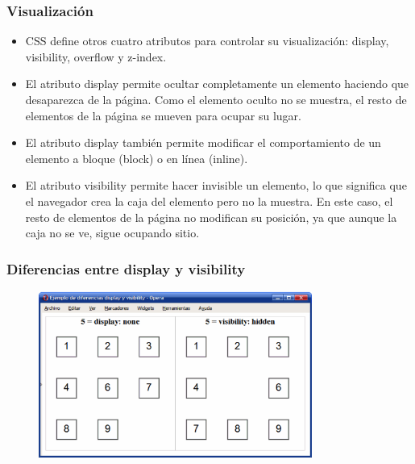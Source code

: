 \documentclass[ucs]{beamer}
\begin{document}
\begin{frame}
\frametitle{Visualización}

\begin{itemize}
  \item CSS define otros cuatro atributos para controlar su visualización: display, visibility, overflow y z-index.
  \item El atributo display permite ocultar completamente un elemento haciendo que desaparezca de la página. Como el elemento oculto no se muestra, el resto de elementos de la página se mueven para ocupar su lugar.
  \item El atributo display también permite modificar el comportamiento de un elemento a bloque (block) o en línea (inline).
  \item El atributo visibility permite hacer invisible un elemento, lo que significa que el navegador crea la caja del elemento pero no la muestra. En este caso, el resto de elementos de la página no modifican su posición, ya que aunque la caja no se ve, sigue ocupando sitio.
\end{itemize}

\end{frame}




\begin{frame}
\frametitle{Diferencias entre display y visibility}

\begin{center}
\begin{figure}[p]
\includegraphics[width=0.8\textwidth]{figs/f0522.png}
\end{figure}
\end{center}

\end{frame}





\end{document}
